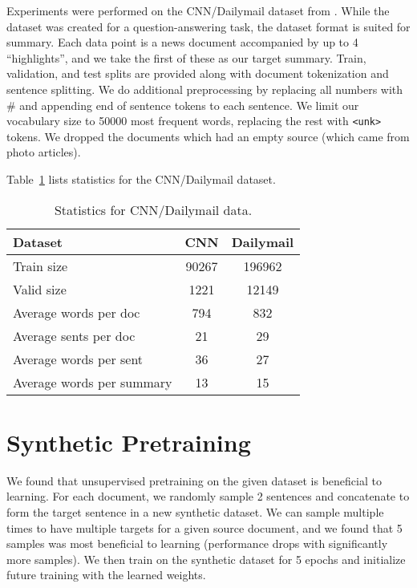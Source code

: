 \documentclass[11pt]{report}
\begin{document}
Experiments were performed on the CNN/Dailymail dataset from \cite{hermann2015read}. While the dataset was created for a question-answering task, the dataset format is suited for summary. Each data point is a news document accompanied by up to 4 ``highlights'', and we take the first of these as our target summary. Train, validation, and test splits are provided along with document tokenization and sentence splitting. We do additional preprocessing by replacing all numbers with \# and appending end of sentence tokens to each sentence. We limit our vocabulary size to 50000 most frequent words, replacing the rest with \texttt{<unk>} tokens. We dropped the documents which had an empty source (which came from photo articles).

 Table~\ref{data_stats} lists statistics for the CNN/Dailymail dataset.

\begin{table}[h]
\centering
\begin{tabular}{lcc}
\toprule
Dataset  & CNN & Dailymail \\
\midrule
Train size & 90267 & 196962 \\
Valid size & 1221 & 12149 \\
Average words per doc & 794 & 832\\
Average sents per doc & 21 & 29\\
Average words per sent & 36 & 27\\
Average words per summary & 13 & 15 \\
\bottomrule
\end{tabular}
\caption{Statistics for CNN/Dailymail data.}
\label{data_stats}
\end{table}


\section{Synthetic Pretraining} %

We found that unsupervised pretraining on the given dataset is beneficial to learning. For each document, we randomly sample 2 sentences and concatenate to form the target sentence in a new synthetic dataset. We can sample multiple times to have multiple targets for a given source document, and we found that 5 samples was most beneficial to learning (performance drops with significantly more samples). We then train on the synthetic dataset for 5 epochs and initialize future training with the learned weights.
\end{document}
